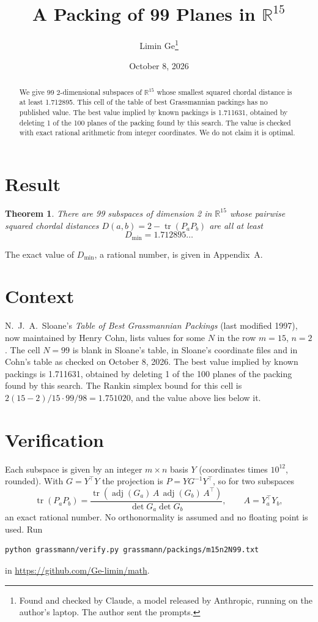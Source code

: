 \documentclass[11pt,a4paper]{article}
\title{A Packing of 99 Planes in $\mathbb{R}^{15}$}
\author{Limin Ge\thanks{Found and checked by Claude, a model released by Anthropic, running on the author's laptop. The author sent the prompts.}}
\date{October 8, 2026}
\newtheorem*{theorem}{Theorem}
\begin{document}
\maketitle
\begin{abstract}
We give 99 2-dimensional subspaces of $\mathbb{R}^{15}$ whose smallest squared chordal distance is at least 1.712895. This cell of the table of best Grassmannian packings has no published value. The best value implied by known packings is 1.711631, obtained by deleting 1 of the 100 planes of the packing found by this search. The value is checked with exact rational arithmetic from integer coordinates. We do not claim it is optimal.
\end{abstract}

\section{Result}
\begin{theorem}
There are 99 subspaces of dimension 2 in $\mathbb{R}^{15}$ whose pairwise squared chordal distances $D(a,b) = 2 - \operatorname{tr}(P_aP_b)$ are all at least
\[ D_{\min} = 1.712895\ldots \]
\end{theorem}
The exact value of $D_{\min}$, a rational number, is given in Appendix~A.


\section{Context}
N.~J.~A.~Sloane's \emph{Table of Best Grassmannian Packings} (last modified 1997), now maintained by Henry Cohn, lists values for some $N$ in the row $m=15$, $n=2$. The cell $N=99$ is blank in Sloane's table, in Sloane's coordinate files and in Cohn's table as checked on October 8, 2026. The best value implied by known packings is 1.711631, obtained by deleting 1 of the 100 planes of the packing found by this search. The Rankin simplex bound for this cell is $2(15-2)/15\cdot 99/98 = 1.751020$, and the value above lies below it.


\section{Verification}
Each subspace is given by an integer $m\times n$ basis $Y$ (coordinates times $10^{12}$, rounded). With $G=Y^\top Y$ the projection is $P=YG^{-1}Y^\top$, so for two subspaces
\[ \operatorname{tr}(P_aP_b)=\frac{\operatorname{tr}(\operatorname{adj}(G_a)\,A\,\operatorname{adj}(G_b)\,A^\top)}{\det G_a\det G_b},\qquad A=Y_a^\top Y_b, \]
an exact rational number. No orthonormality is assumed and no floating point is used. Run
\begin{verbatim}
python grassmann/verify.py grassmann/packings/m15n2N99.txt
\end{verbatim}
in \url{https://github.com/Ge-limin/math}.
\end{document}

